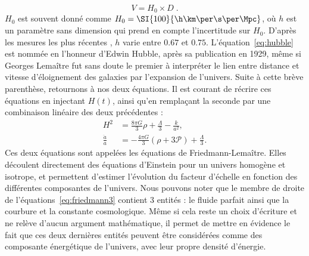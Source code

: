 \begin{equation}
  \label{eq:hubble}
  V = H_0 \times D  \; .
\end{equation}
$H_0$ est souvent donné comme $H_{0} = \SI{100}{\h\km\per\s\per\Mpc}$, où $h$ est un paramètre sans dimension qui prend en compte l'incertitude sur $H_0$. D'après les mesures les plus récentes \autocite{Collaboration2018,Riess2019}, $h$ varie entre $\num{0,67}$ et $\num{0,75}$.
L'équation~\ref{eq:hubble} est nommée en l'honneur d'Edwin Hubble, après sa publication en 1929, même si Georges Lemaître fut sans doute le premier à interpréter le lien entre distance et vitesse d'éloignement des galaxies par l'expansion de l'univers.
Suite à cette brève parenthèse, retournons à nos deux équations. Il est courant de récrire ces équations en injectant $H(t)$, ainsi qu'en remplaçant la seconde par une combinaison linéaire des deux précédentes :
\begin{align}
  \label{eq:friedmann3}
  H^2 &= \frac{8 \pi G}{3} \rho + \frac{\Lambda}{3} - \frac{k}{a^2} ,\\
  \label{eq:friedmann4}
  \frac{\ddot{a}}{a} &= - \frac{4 \pi G}{3} (\rho + 3 \mathcal{P}) + \frac{\Lambda}{3} .
\end{align}
Ces deux équations sont appelées les équations de Friedmann-Lemaître. Elles découlent directement des équations d'Einstein pour un univers homogène et isotrope,
et permettent d'estimer l'évolution du facteur d'échelle en fonction des différentes composantes de l'univers.
Nous pouvons noter que le membre de droite de l'équations~\ref{eq:friedmann3} contient 3 entités : le fluide parfait ainsi que la courbure et la constante cosmologique. Même si cela reste un choix d'écriture et ne relève d'aucun argument mathématique, il permet de mettre en évidence le fait que ces deux dernières entités peuvent être considérées comme des composante énergétique de l'univers, avec leur propre densité d'énergie.


